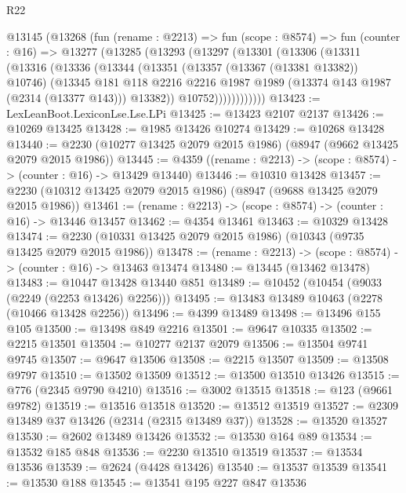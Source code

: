 \begin{lexlean}{R22}
\begin{coremodule}
    @13145
      (@13268
        (fun (rename : @2213) =>
        fun (scope : @8574) =>
        fun (counter : @16) =>
        @13277
          (@13285
            (@13293
              (@13297
                (@13301
                  (@13306
                    (@13311
                      (@13316
                        (@13336
                          (@13344
                            (@13351
                              (@13357 (@13367 (@13381 @13382)) @10746)
                              (@13345
                                @181
                                @118
                                @2216
                                @2216
                                @1987
                                @1989
                                (@13374 @143 @1987 (@2314 (@13377 @143)))
                                @13382))
                            @10752))))))))))))
@13423 := LexLeanBoot.LexiconLse.Lse.LPi
@13425 := @13423 @2107 @2137
@13426 := @10269 @13425
@13428 := @1985 @13426 @10274
@13429 := @10268 @13428
@13440 := @2230 (@10277 @13425 @2079 @2015 @1986) (@8947 (@9662 @13425 @2079 @2015 @1986))
@13445 := @4359 ((rename : @2213) -> (scope : @8574) -> (counter : @16) -> @13429 @13440)
@13446 := @10310 @13428
@13457 := @2230 (@10312 @13425 @2079 @2015 @1986) (@8947 (@9688 @13425 @2079 @2015 @1986))
@13461 := (rename : @2213) -> (scope : @8574) -> (counter : @16) -> @13446 @13457
@13462 := @4354 @13461
@13463 := @10329 @13428
@13474 := @2230 (@10331 @13425 @2079 @2015 @1986) (@10343 (@9735 @13425 @2079 @2015 @1986))
@13478 := (rename : @2213) -> (scope : @8574) -> (counter : @16) -> @13463 @13474
@13480 := @13445 (@13462 @13478)
@13483 := @10447 @13428 @13440 @851
@13489 := @10452 (@10454 (@9033 (@2249 (@2253 @13426) @2256)))
@13495 := @13483 @13489 @10463 (@2278 (@10466 @13428 @2256))
@13496 := @4399 @13489
@13498 := @13496 @155 @105
@13500 := @13498 @849 @2216
@13501 := @9647 @10335
@13502 := @2215 @13501
@13504 := @10277 @2137 @2079
@13506 := @13504 @9741 @9745
@13507 := @9647 @13506
@13508 := @2215 @13507
@13509 := @13508 @9797
@13510 := @13502 @13509
@13512 := @13500 @13510 @13426
@13515 := @776 (@2345 @9790 @4210)
@13516 := @3002 @13515
@13518 := @123 (@9661 @9782)
@13519 := @13516 @13518
@13520 := @13512 @13519
@13527 := @2309 @13489 @37 @13426 (@2314 (@2315 @13489 @37))
@13528 := @13520 @13527
@13530 := @2602 @13489 @13426
@13532 := @13530 @164 @89
@13534 := @13532 @185 @848
@13536 := @2230 @13510 @13519
@13537 := @13534 @13536
@13539 := @2624 (@4428 @13426)
@13540 := @13537 @13539
@13541 := @13530 @188
@13545 := @13541 @195 @227 @847 @13536

\end{coremodule}
\end{lexlean}
